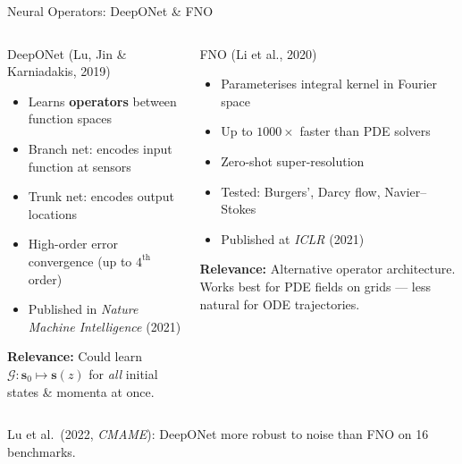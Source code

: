 \documentclass[aspectratio=169, 11pt]{beamer}
\newcommand{\vb}[1]{\bm{#1}}
\begin{document}
\begin{frame}{Neural Operators: DeepONet \& FNO}
  \begin{columns}[T]
    \begin{block}{DeepONet \small (Lu, Jin \& Karniadakis, 2019)}
      \begin{itemize}
        \item Learns \textbf{operators} between function spaces
        \item Branch net: encodes input function at sensors
        \item Trunk net: encodes output locations
        \item High-order error convergence (up to $4^\text{th}$ order)
        \item Published in \textit{Nature Machine Intelligence} (2021)
      \end{itemize}

      \medskip
      \textcolor{lhcbblue}{\textbf{Relevance:}} Could learn $\mathcal{G}: \vb{s}_0 \mapsto \vb{s}(z)$ for \emph{all} initial states \& momenta at once.
    \end{block}

    \begin{block}{FNO \small (Li et al., 2020)}
      \begin{itemize}
        \item Parameterises integral kernel in Fourier space
        \item Up to $1000\times$ faster than PDE solvers
        \item Zero-shot super-resolution
        \item Tested: Burgers', Darcy flow, Navier--Stokes
        \item Published at \textit{ICLR} (2021)
      \end{itemize}

      \medskip
      \textcolor{lhcbblue}{\textbf{Relevance:}} Alternative operator architecture. Works best for PDE fields on grids --- less natural for ODE trajectories.
    \end{block}
  \end{columns}

  \medskip
  \centering
  Lu et al.\ (2022, \textit{CMAME}): DeepONet more robust to noise than FNO on 16 benchmarks.
\end{frame}

\end{document}
